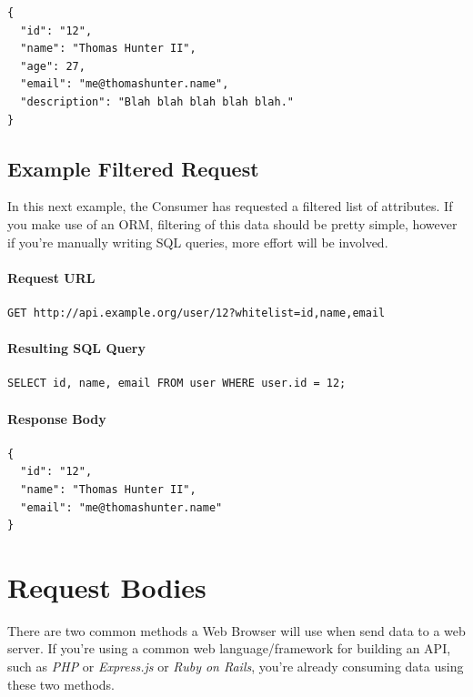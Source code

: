 \documentclass{book}
\begin{document}
\begin{verbatim}
{
  "id": "12",
  "name": "Thomas Hunter II",
  "age": 27,
  "email": "me@thomashunter.name",
  "description": "Blah blah blah blah blah."
}
\end{verbatim}

\subsection{Example Filtered Request}

In this next example, the Consumer has requested a filtered list of attributes. If you make use of an ORM, filtering of this data should be pretty simple, however if you're manually writing SQL queries, more effort will be involved.

\paragraph{\textbf{Request URL}}

\begin{verbatim}
GET http://api.example.org/user/12?whitelist=id,name,email
\end{verbatim}

\paragraph{\textbf{Resulting SQL Query}}

\begin{verbatim}
SELECT id, name, email FROM user WHERE user.id = 12;
\end{verbatim}

\paragraph{\textbf{Response Body}}

\begin{verbatim}
{
  "id": "12",
  "name": "Thomas Hunter II",
  "email": "me@thomashunter.name"
}
\end{verbatim}


\section{Request Bodies}

There are two common methods a Web Browser will use when send data to a web server. If you're using a common web language/framework for building an API, such as \emph{PHP} or \emph{Express.js} or \emph{Ruby on Rails}, you're already consuming data using these two methods.
\end{document}
